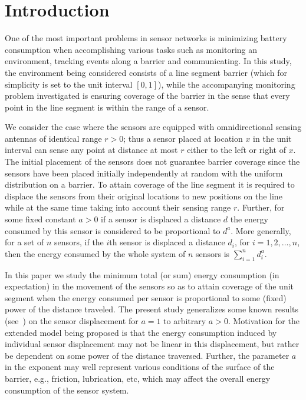 \documentclass[final,5p,times,twocolumn]{elsarticle_mod}
\begin{document}
\section{Introduction}
One of the most important problems in sensor networks is minimizing battery consumption when accomplishing various tasks such as monitoring an environment, tracking events along a barrier and communicating. In this study, the environment being considered consists of a line segment barrier (which for simplicity is set to the unit interval $[0, 1]$), while the accompanying monitoring problem investigated is ensuring coverage of the barrier in the sense that every point in the line segment is within the range of a sensor. 

We consider the case where the sensors are equipped with omnidirectional sensing antennas of identical range $r>0$; thus a sensor placed at location $x$ in the unit interval 
can sense any point at distance at most $r$ either to the left or right of $x$. 
The initial placement of the sensors does not guarantee barrier coverage since the sensors have been placed initially independently at random with the uniform distribution on a barrier. 
To attain coverage of the line segment it is required to displace the sensors from their original locations to new positions on the line while at the same time taking 
into account their sensing range $r$. Further, for some fixed constant $a > 0$ if a sensor is displaced a distance $d$ the energy consumed by this sensor is considered 
to be proportional to $d^a$. 
More generally, for a set of $n$ sensors, if the $i$th sensor is displaced a distance $d_i$, for $i=1,2,\ldots ,n$, 
then the energy consumed by the whole system of $n$ sensors is $\sum_{i=1}^n d_i^a$.  

In this paper we study the minimum total (or sum) energy consumption (in expectation) in the movement of the sensors so as to attain coverage of the unit segment when 
the energy consumed per sensor is proportional to some (fixed) power of the distance traveled. The present study generalizes some known results (see~\cite{spa_2013}) on the sensor displacement for $a=1$ to arbitrary $a >0$. Motivation for the extended model being proposed is that the energy consumption induced by individual sensor displacement may not be linear in this displacement, but rather be dependent on some power of the distance traversed. Further, the parameter $a$ in the exponent may well represent various conditions of the surface of the barrier, e.g., friction, lubrication, etc, which may affect the overall energy consumption of the sensor system. 
\end{document}
